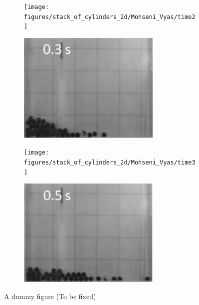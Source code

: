 \documentclass[preprint,12pt]{elsarticle}
\begin{document}
\begin{figure}[!htpb]
  \begin{subfigure}{0.48\textwidth}
    \centering
    \texttt{[image: figures/stack\_of\_cylinders\_2d/Mohseni\_Vyas/time2]}
  \end{subfigure}
  \begin{subfigure}{0.48\textwidth}
    \centering
    \includegraphics[width=0.75\textwidth]{images/stack_of_cylinders_experimental_images/time2}
  \end{subfigure}

  \begin{subfigure}{0.48\textwidth}
    \centering
    \texttt{[image: figures/stack\_of\_cylinders\_2d/Mohseni\_Vyas/time3]}
  \end{subfigure}
  \begin{subfigure}{0.48\textwidth}
    \centering
    \includegraphics[width=0.75\textwidth]{images/stack_of_cylinders_experimental_images/time3}
  \end{subfigure}
\caption{A dummy figure (To be fixed)}
\label{fig:snapshots-stack-of-cylinders}
\end{figure}
%
\end{document}
